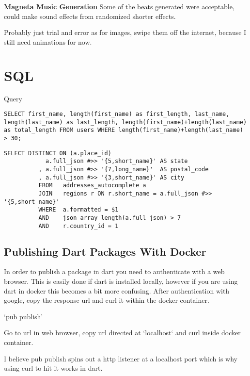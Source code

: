 
\textbf{Magneta Music Generation} Some of the beats generated were acceptable, could make sound effects from randomized shorter effects.

Probably just trial and error as for images, swipe them off the internet, because I still need animations for now.


\section{SQL}

Query
\begin{lstlisting}[caption={SQL Query for length}]
SELECT first_name, length(first_name) as first_length, last_name, length(last_name) as last_length, length(first_name)+length(last_name) as total_length FROM users WHERE length(first_name)+length(last_name) > 30;
\end{lstlisting}

\begin{lstlisting}[caption={SQL Query for addresses}]
SELECT DISTINCT ON (a.place_id)
            a.full_json #>> '{5,short_name}' AS state
          , a.full_json #>> '{7,long_name}'  AS postal_code
          , a.full_json #>> '{3,short_name}' AS city
          FROM   addresses_autocomplete a
          JOIN   regions r ON r.short_name = a.full_json #>> '{5,short_name}'
          WHERE  a.formatted = $1
          AND    json_array_length(a.full_json) > 7
          AND    r.country_id = 1
\end{lstlisting}

\subsection{Publishing Dart Packages With Docker}

In order to publish a package in dart you need to authenticate with a web browser. This is easily done if dart is installed locally, however if you are using dart in docker this becomes a bit more confusing.
After authentication with google, copy the response url and curl it within the docker container.

`pub publish'

Go to url in web browser, copy url directed at `localhost` and curl inside docker container.

I believe pub publish spins out a http listener at a localhost port which is why using curl to hit it works in dart.
